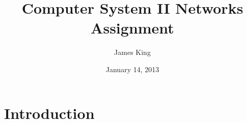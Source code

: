 \documentclass[a4paper]{article}
\title{Computer System II Networks Assignment}
\date{January 14, 2013}
\author{James King}
\begin{document}
\maketitle
\section{Introduction}

\end{document}

